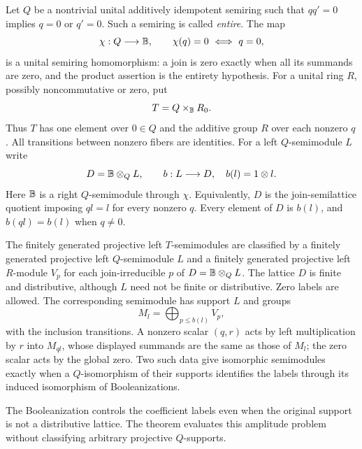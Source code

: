Let $Q$ be a nontrivial unital additively idempotent semiring such that
$qq'=0$ implies $q=0$ or $q'=0$. Such a semiring is called \emph{entire}.
The map
\[
 \chi:Q\longrightarrow\B,\qquad \chi(q)=0\ \Longleftrightarrow\ q=0,
\]
is a unital semiring homomorphism: a join is zero exactly when all its
summands are zero, and the product assertion is the entirety hypothesis.
For a unital ring $R$, possibly noncommutative or zero, put
\[
 T=Q\times_{\mathbb B}R_0.
\]
Thus $T$ has one element over $0\in Q$ and the additive group $R$ over
each nonzero $q$. All transitions between nonzero fibers are identities.
For a left $Q$-semimodule $L$ write
\[
 D=\mathbb B\otimes_Q L,\qquad b:L\longrightarrow D,\quad b(l)=1\otimes l.
\]
Here $\mathbb B$ is a right $Q$-semimodule through $\chi$. Equivalently, $D$ is
the join-semilattice quotient imposing $ql=l$ for every nonzero $q$.
Every element of $D$ is $b(l)$, and $b(ql)=b(l)$ when $q\ne0$.

\begin{theorem}\label{thm:entire-support-projectives}
The finitely generated projective left $T$-semimodules are classified by
a finitely generated projective left $Q$-semimodule $L$ and a finitely
generated projective left $R$-module $V_p$ for each join-irreducible $p$
of $D=\mathbb B\otimes_Q L$. The lattice $D$ is finite and distributive,
although $L$ need not be finite or distributive. Zero labels are allowed.
The corresponding semimodule has support $L$ and groups
\[
 M_l=\bigoplus_{p\le b(l)}V_p,
\]
with the inclusion transitions. A nonzero scalar $(q,r)$ acts by left
multiplication by $r$ into $M_{ql}$, whose displayed summands are the
same as those of $M_l$; the zero scalar acts by the global zero.
Two such data give isomorphic semimodules exactly when a $Q$-isomorphism
of their supports identifies the labels through its induced isomorphism
of Booleanizations.
\end{theorem}
The Booleanization controls the coefficient labels even when the original support is not a distributive lattice. The theorem evaluates this amplitude problem without classifying arbitrary projective $Q$-supports.
